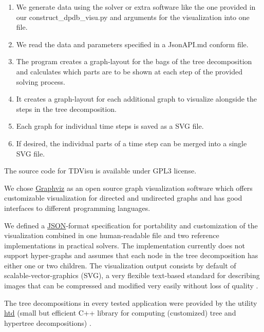 \documentclass[a4paper, 12pt, bibliography=totoc]{scrartcl}
\begin{document}
\begin{enumerate}
	\item We generate data using the solver or extra software like the one provided in our construct\_dpdb\_visu.py and arguments for the visualization into one file.
	\item We read the data and parameters specified in a JsonAPI.md conform file.
	\item The program creates a graph-layout for the bags of the tree decomposition and calculates which parts are to be shown at each step of the provided solving process.
	\item It creates a graph-layout for each additional graph to visualize alongside the steps in the tree decomposition.
	\item Each graph for individual time steps is saved as a SVG file.
	\item If desired, the individual parts of a time step can be merged into a single SVG file.
\end{enumerate}


The source code for TDVisu is available under GPL3 license.

We chose \href{https://graphviz.org/}{Graphviz} as an open source graph visualization software which offers customizable visualization for directed and undirected graphs and has good interfaces to different programming languages.

We defined a \href{https://www.json.org/json-en.html}{JSON}-format specification for portability and customization of the visualization combined in one human-readable file and two reference implementations in practical solvers.
The implementation currently does not support hyper-graphs and assumes that each node in the tree decomposition has either one or two children.
The visualization output consists by default of scalable-vector-graphics (SVG), a very flexible text-based standard for describing images that can be compressed and modified very easily without loss of quality \cite{SVGMozilla}.

The tree decompositions in every tested application were provided by the utility \href{https://github.com/mabseher/htd}{htd} (small but efficient C++ library for computing (customized) tree and hypertree decompositions) \cite{htd}.
\end{document}
